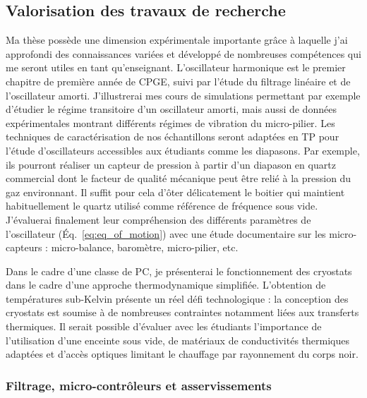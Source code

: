 \documentclass[12pt,a4paper]{article}
\begin{document}
\subsection{Valorisation des travaux de recherche}

Ma thèse possède une dimension expérimentale importante grâce à laquelle j'ai approfondi des connaissances variées et développé de nombreuses compétences qui me seront utiles en tant qu'enseignant.
L'oscillateur harmonique est le premier chapitre de première année de CPGE, suivi par l'étude du filtrage linéaire et de l'oscillateur amorti.
J'illustrerai mes cours de simulations permettant par exemple d'étudier le régime transitoire d'un oscillateur amorti, mais aussi de données expérimentales montrant différents régimes de vibration du micro-pilier.
Les techniques de caractérisation de nos échantillons seront adaptées en TP pour l'étude d'oscillateurs accessibles aux étudiants comme les diapasons.
Par exemple, ils pourront réaliser un capteur de pression à partir d'un diapason en quartz commercial dont le facteur de qualité mécanique peut être relié à la pression du gaz environnant.
Il suffit pour cela d'ôter délicatement le boitier qui maintient habituellement le quartz utilisé comme référence de fréquence sous vide.
J'évaluerai finalement leur compréhension des différents paramètres de l'oscillateur (\'Eq.~\eqref{eq:eq_of_motion}) avec une étude documentaire sur les micro-capteurs : micro-balance, baromètre, micro-pilier, etc.

Dans le cadre d'une classe de PC, je présenterai le fonctionnement des cryostats dans le cadre d'une approche thermodynamique simplifiée.
L'obtention de températures sub-Kelvin présente un réel défi technologique : la conception des cryostats est soumise à de nombreuses contraintes notamment liées aux transferts thermiques.
Il serait possible d'évaluer avec les étudiants l'importance de l'utilisation d'une enceinte sous vide, de matériaux de conductivités thermiques adaptées et d'accès optiques limitant le chauffage par rayonnement du corps noir.

\subsubsection{Filtrage, micro-contrôleurs et asservissements}
\label{sec:controls}
\end{document}
